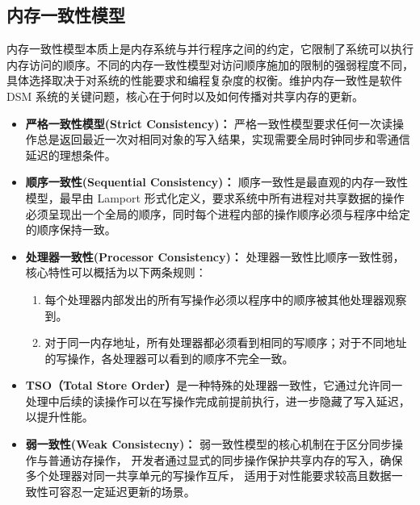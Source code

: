 {    \subsection{内存一致性模型}
    内存一致性模型本质上是内存系统与并行程序之间的约定，它限制了系统可以执行内存访问的顺序。不同的内存一致性模型对访问顺序施加的限制的强弱程度不同，具体选择取决于对系统的性能要求和编程复杂度的权衡。维护内存一致性是软件 DSM 系统的关键问题，核心在于何时以及如何传播对共享内存的更新。

    \begin{itemize}
        \item \textbf{严格一致性模型(Strict Consistency)：} 严格一致性模型要求任何一次读操作总是返回最近一次对相同对象的写入结果，实现需要全局时钟同步和零通信延迟的理想条件。

        \item \textbf{顺序一致性(Sequential Consistency)：} 顺序一致性是最直观的内存一致性模型，最早由 Lamport 形式化定义，要求系统中所有进程对共享数据的操作必须呈现出一个全局的顺序，同时每个进程内部的操作顺序必须与程序中给定的顺序保持一致。

        \item \textbf{处理器一致性(Processor Consistency)：} 处理器一致性比顺序一致性弱，核心特性可以概括为以下两条规则：
              \begin{enumerate}[label=\arabic*.]
                  \item 每个处理器内部发出的所有写操作必须以程序中的顺序被其他处理器观察到。
                  \item 对于同一内存地址，所有处理器都必须看到相同的写顺序；对于不同地址的写操作，各处理器可以看到的顺序不完全一致。
              \end{enumerate}

        \item \textbf{TSO（Total Store Order）}是一种特殊的处理器一致性，它通过允许同一处理中后续的读操作可以在写操作完成前提前执行，进一步隐藏了写入延迟，以提升性能。

        \item \textbf{弱一致性(Weak Consistecny)：} 弱一致性模型的核心机制在于区分同步操作与普通访存操作，
              开发者通过显式的同步操作保护共享内存的写入，确保多个处理器对同一共享单元的写操作互斥，
              适用于对性能要求较高且数据一致性可容忍一定延迟更新的场景。


\end{itemize}}
